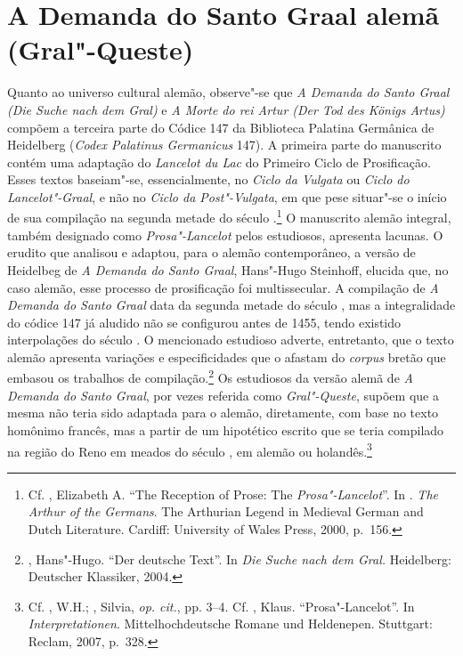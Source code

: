 \section{A Demanda do Santo Graal alemã (Gral"-Queste)}

Quanto ao universo cultural alemão, observe"-se que  \textit{A Demanda do Santo
Graal} \textit{(Die Suche nach dem Gral) }e \textit{A Morte do rei Artur (Der
Tod des Königs Artus)} compõem a terceira parte do Códice 147 da Biblioteca
Palatina Germânica de Heidelberg (\textit{Codex Palatinus Germanicus} 147). A
primeira parte do manuscrito contém uma adaptação do \textit{Lancelot du Lac} do
Primeiro Ciclo de Prosificação. Esses textos baseiam"-se, essencialmente, no
\textit{Ciclo da Vulgata} ou \textit{Ciclo do Lancelot"-Graal}, e não no
\textit{Ciclo da Post"-Vulgata}, em que pese situar"-se o início de sua compilação
na segunda metade do século .\footnote{ Cf. , Elizabeth A.
“The Reception of Prose: The \textit{Prosa"-Lancelot}”. In . \textit{The
Arthur of the Germans}. The Arthurian Legend in Medieval German and Dutch
Literature. Cardiff: University of Wales Press, 2000, p.~156. } O manuscrito
alemão integral, também designado como \textit{Prosa"-Lancelot} pelos estudiosos,
apresenta lacunas. O erudito que analisou e adaptou, para o alemão
contemporâneo, a versão de Heidelbeg de\textit{ A Demanda do Santo Graal},
Hans"-Hugo Steinhoff, elucida que, no caso alemão, esse processo de prosificação
foi multissecular. A compilação de \textit{A Demanda do Santo Graal} data da
segunda metade do século , mas a integralidade do códice 147 já aludido não
se configurou antes de 1455, tendo existido interpolações do século
. O mencionado estudioso adverte, entretanto, que o texto alemão
apresenta variações e especificidades que o afastam do \textit{corpus} bretão
que embasou os trabalhos de compilação.\footnote{ , Hans"-Hugo. “Der
deutsche Text”.  In \textit{Die Suche nach dem Gral. }Heidelberg: Deutscher
Klassiker, 2004.  } Os estudiosos da versão alemã de \textit{A Demanda
do Santo Graal}, por vezes referida como \textit{Gral"-Queste}, supõem que a
mesma não teria sido adaptada para o alemão, diretamente, com base no texto
homônimo francês, mas a partir de um hipotético escrito que se teria compilado
na região do Reno em meados do século , em alemão ou
holandês.\footnote{ Cf. , W.H.;  , Silvia, \textit{op. cit.}, pp.
3--4. Cf. , Klaus.  “Prosa"-Lancelot”. In
\textit{Interpretationen}. Mittelhochdeutsche Romane und Heldenepen. Stuttgart:
Reclam, 2007, p.~328. }

